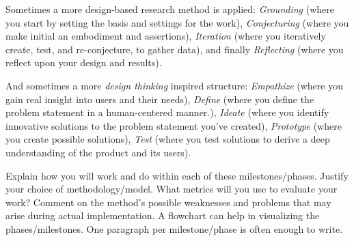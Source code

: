 Sometimes a more design-based research method is applied: \emph{Grounding} (where you start by setting the basis and settings for the work), \emph{Conjecturing} (where you make initial an embodiment and assertions), \emph{Iteration} (where you iteratively create, test, and re-conjecture, to gather data), and finally \emph{Reflecting} (where you reflect upon your design and results).

And sometimes a more \emph{design thinking} inspired structure: \emph{Empathize} (where you gain real insight into users and their needs), \emph{Define} (where you define the problem statement in a human-centered manner.), \emph{Ideate} (where you identify innovative solutions to the problem statement you’ve created), \emph{Prototype} (where you create possible solutions), \emph{Test} (where you test solutions to derive a deep understanding of the product and its users). 

Explain how you will work and do within each of these milestones/phases. Justify your choice of methodology/model. What metrics will you use to evaluate your work? Comment on the method's possible weaknesses and problems that may arise during actual implementation. A flowchart can help in visualizing the phases/milestones. One paragraph per milestone/phase is often enough to write.